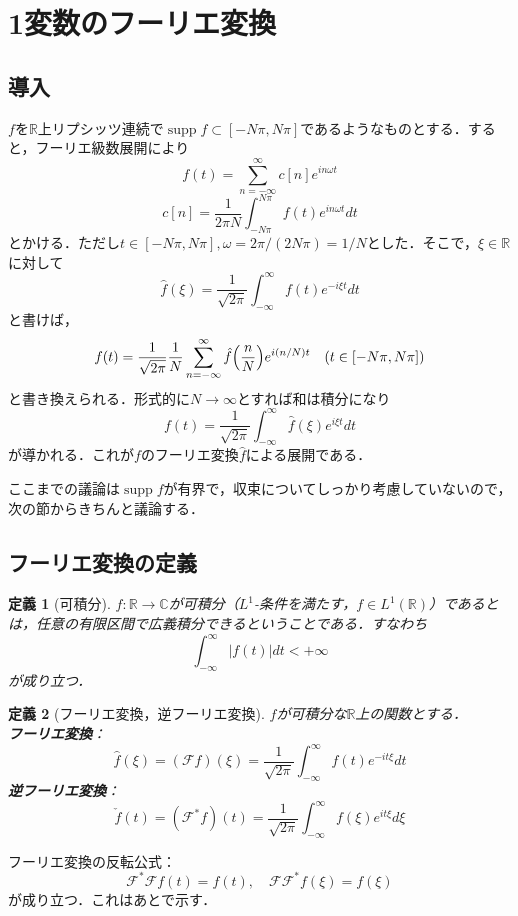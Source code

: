 \documentclass[dvipdfmx,a4j,10pt]{jsarticle}
\theoremstyle{mystyle1}
\theoremstyle{mystyle3}
\theoremstyle{mystyle4}
\theoremstyle{mystyle6}
\newtheorem{definition}{定義}[section]
\theoremstyle{mystyle2}
\theoremstyle{mystyle5}
\newenvironment{dfn}[1][]
{\begin{tcolorbox}[
    enhanced,
    boxrule=0pt,
    arc=0mm,
    frame hidden,
    borderline west={2pt}{-4pt}{green!60!black},
    breakable = true
    ]
    \begin{definition}[#1]
}
{\end{definition}\end{tcolorbox}}
\DeclareMathOperator{\supp}{supp}
\begin{document}
\section{1変数のフーリエ変換}

\subsection{導入}

$f$を$\mathbb{R}$上リプシッツ連続で$\supp f\subset[-N\pi,N\pi]$であるようなものとする．すると，フーリエ級数展開により
\[
	f(t)=\sum_{n=-\infty}^\infty c[n]e^{in\omega t}
\]
\[
	c[n]=\frac{1}{2\pi N}\int_{-N\pi}^{N\pi}f(t)e^{in\omega t}dt
\]
とかける．ただし$t\in[-N\pi,N\pi],\omega=2\pi/(2N\pi)=1/N$とした．そこで，$\xi\in\mathbb{R}$に対して
\[
	\hat f(\xi)=\frac{1}{\sqrt{2\pi}}  \int_{-\infty}^\infty f(t)e^{-i\xi t}dt
\]
と書けば，
\[
	f(t)=\frac{1}{\sqrt{2\pi}}\frac{1}{N}\sum_{n=-\infty}^\infty \hat f\mleft(\frac{n}{N}\mright)e^{i(n/N)t}\quad(t\in[-N\pi,N\pi])
\]
と書き換えられる．形式的に$N\to\infty$とすれば和は積分になり
\[
	f(t)=\frac{1}{\sqrt{2\pi}}\int_{-\infty}^\infty\hat f(\xi)e^{i\xi t}dt
\]
が導かれる．これが$f$のフーリエ変換$\hat f$による展開である．

ここまでの議論は$\supp f$が有界で，収束についてしっかり考慮していないので，次の節からきちんと議論する．

\subsection{フーリエ変換の定義}

\begin{dfn}[可積分]
	$f:\mathbb{R}\to\mathbb{C}$が可積分（$L^1$-条件を満たす，$f\in L^1(\mathbb{R})$）であるとは，任意の有限区間で広義積分できるということである．すなわち
	\[
		\int_{-\infty}^\infty |f(t)|dt<+\infty
	\]
	が成り立つ．
\end{dfn}

\begin{dfn}[フーリエ変換，逆フーリエ変換]
	$f$が可積分な$\mathbb{R}$上の関数とする．\\
	\textbf{フーリエ変換}：
	\[
		\hat f(\xi)=(\mathcal{F}f)(\xi)=\frac{1}{\sqrt{2\pi}}\int_{-\infty}^\infty f(t)e^{-it\xi}dt
	\]
	\textbf{逆フーリエ変換}：
	\[
		\check{f}(t)=(\mathcal{F}^*f)(t)=\frac{1}{\sqrt{2\pi}}\int_{-\infty}^\infty f(\xi)e^{it\xi}d\xi
	\]
\end{dfn}

フーリエ変換の反転公式：
\[
	\mathcal{F}^*\mathcal{F}f(t)=f(t),\quad \mathcal{F}\mathcal{F}^*f(\xi)=f(\xi)
\]
が成り立つ．これはあとで示す．
\end{document}
